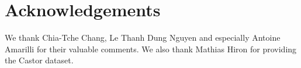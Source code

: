 \documentclass{sig-alternate}
\begin{document}

\section{Acknowledgements}

We thank Chia-Tche Chang, Le Thanh Dung Nguyen and especially Antoine Amarilli for their valuable comments. We also thank Mathias Hiron for providing the Castor dataset.

%

%
%

\end{document}
